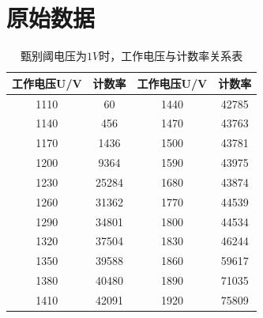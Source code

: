 \documentclass[a4paper,UTF8]{ctexart}
\begin{document}
\section{原始数据}

\begin{table}[H]
    \centering
    \caption{甄别阈电压为$1V$时，工作电压与计数率关系表}
    \begin{tabular}{|c|c|c|c|}
    \hline
        \textbf{工作电压U/V} & \textbf{计数率} & \textbf{工作电压U/V} & \textbf{计数率} \\ \hline
        1110 & 60 & 1440 & 42785 \\ \hline
        1140 & 456 & 1470 & 43763 \\ \hline
        1170 & 1436 & 1500 & 43781 \\ \hline
        1200 & 9364 & 1590 & 43975 \\ \hline
        1230 & 25284 & 1680 & 43874 \\ \hline
        1260 & 31362 & 1770 & 44539 \\ \hline
        1290 & 34801 & 1800 & 44534 \\ \hline
        1320 & 37504 & 1830 & 46244 \\ \hline
        1350 & 39588 & 1860 & 59617 \\ \hline
        1380 & 40480 & 1890 & 71035 \\ \hline
        1410 & 42091 & 1920 & 75809 \\ \hline
    \end{tabular}
\end{table}
\end{document}
